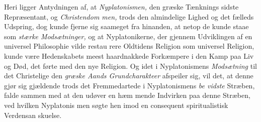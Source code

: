 Heri ligger Antydningen af, at \emph{Nyplatonismen,} den
græske Tænknings sidste Repræsentant, og \emph{Christendom\-%
men,} trods den almindelige Lighed og det fælleds Udspring,
dog kunde fjerne sig saameget fra hinanden, at netop de kunde
staae som \emph{stærke Modsætninger,} og at Nyplatonikerne, der
gjennem Udviklingen af en universel Philosophie vilde restau\-%
rere Oldtidens Religion som universel Religion, kunde være
Hedenskabets meest haardnakkede Forkæmpere i den Kamp
paa Liv og Død, det førte med den nye Religion. Og idet i
Nyplatonismens \emph{Modsætning} til det Christelige den \emph{græske
Aands Grundcharakteer} afspeiler sig, vil det, at denne gjør
sig gjældende trods det Fremmedartede i Nyplatonismens \emph{be\-%
vidste} Stræben, falde sammen med at den udøver en hæm\-%
mende Indvirken paa denne Stræben, ved hvilken Nyplatonis\-%
men søgte hen imod en consequent spiritualistisk Verdensan\-%
skuelse.

